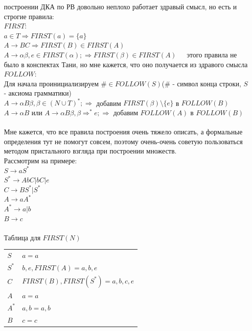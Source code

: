 \documentclass[14pt]{extreport}
\begin{document}
	построении ДКА по РВ довольно неплохо работает здравый смысл, но есть и строгие правила:\\
	$FIRST$:\\
	\hspace*{30pt} $a \in T \Rightarrow FIRST(a)=\{a\}$\\
	\hspace*{30pt} $A \to BC \Rightarrow FIRST(B) \in FIRST(A)$\\
	\hspace*{30pt} $A \to \alpha \beta, e \in FIRST(\alpha); \Rightarrow FIRST(\beta)
	\in FIRST(A)$\ \ \ этого правила не было в
	\hspace*{30pt} конспектах Тани, но мне кажется, что оно получается из здравого смысла\\
	$FOLLOW$:\\
	\hspace*{30pt}Для начала проинициализируем $\# \in FOLLOW(S)$(\# - символ конца строки,
	\hspace*{30pt}$S$ - аксиома грамматики)\\
	\hspace*{30pt}$A \to \alpha B \beta, \beta \in (N \cup T)^*; \Rightarrow$ добавим
	$FIRST(\beta) \setminus \{e\}$ в $FOLLOW(B)$\\
	\hspace*{30pt}$A \to \alpha B$ или $A \to \alpha B \beta, \beta \Rightarrow ^* e;
	\Rightarrow$ добавим $FOLLOW(A)$ в $FOLLOW(B)$\\\\
	Мне кажется, что все правила построения очень тяжело описать, а формальные определения
	тут не помогут совсем, поэтому очень-очень советую пользоваться методом пристального
	взгляда при построении множеств.\\
	Рассмотрим на примере:\\
	$S \to aS^*$\\
	$S^* \to AbC | bC | e$\\
	$C \to BS^* | S^*$\\
	$A \to aA^*$\\
	$A^* \to a|b$\\
	$B \to c$\\\\
	Таблица для $FIRST(N)$ \\
	\begin{tabular}{ll}
			 $S$ & $a=a$ \\
			 $S^*$ & $b,e,FIRST(A)=a,b,e$ \\
			 $C$ & $FIRST(B),FIRST(S^*)=a,b,c,e$ \\
			 $A$ & $a=a$ \\
			 $A^*$ & $a,b=a,b$ \\
			 $B$ & $c=c$ \\
	\end{tabular}\\\\
\end{document}
